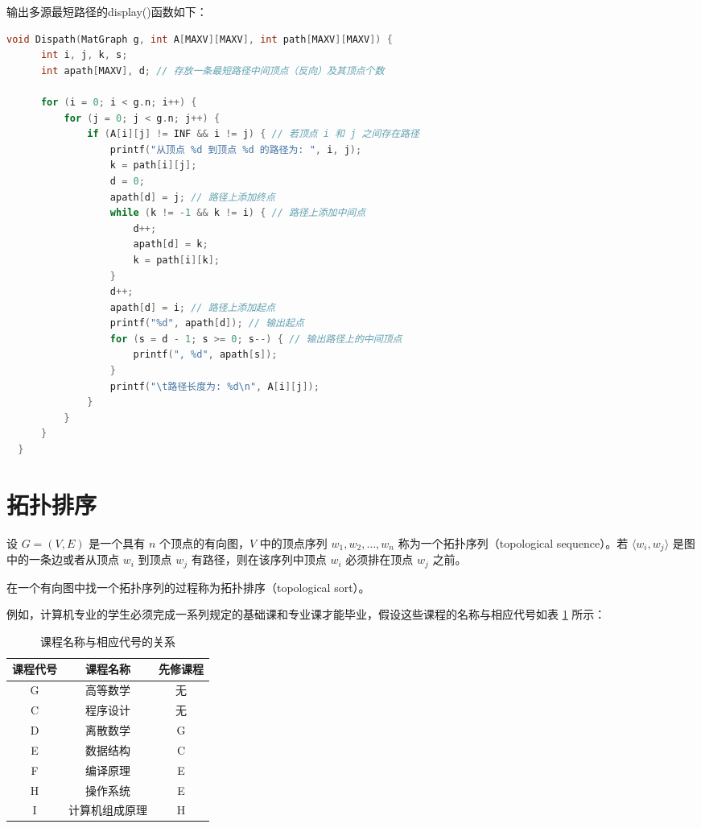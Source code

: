 \documentclass[lang=cn,newtx,10pt,scheme=chinese]{../elegantbook}
\begin{document}
输出多源最短路径的display()函数如下：

\begin{lstlisting}[language=C, caption={输出最短路径的 Dispath 函数}]
  void Dispath(MatGraph g, int A[MAXV][MAXV], int path[MAXV][MAXV]) {
      int i, j, k, s;
      int apath[MAXV], d; // 存放一条最短路径中间顶点（反向）及其顶点个数
  
      for (i = 0; i < g.n; i++) {
          for (j = 0; j < g.n; j++) {
              if (A[i][j] != INF && i != j) { // 若顶点 i 和 j 之间存在路径
                  printf("从顶点 %d 到顶点 %d 的路径为: ", i, j);
                  k = path[i][j];
                  d = 0;
                  apath[d] = j; // 路径上添加终点
                  while (k != -1 && k != i) { // 路径上添加中间点
                      d++;
                      apath[d] = k;
                      k = path[i][k];
                  }
                  d++;
                  apath[d] = i; // 路径上添加起点
                  printf("%d", apath[d]); // 输出起点
                  for (s = d - 1; s >= 0; s--) { // 输出路径上的中间顶点
                      printf(", %d", apath[s]);
                  }
                  printf("\t路径长度为: %d\n", A[i][j]);
              }
          }
      }
  }
  \end{lstlisting}

\section{拓扑排序}

设 $G = (V, E)$ 是一个具有 $n$ 个顶点的有向图，$V$ 中的顶点序列 $w_1, w_2, \dots, w_n$ 称为一个拓扑序列（topological sequence）。若 $\langle w_i, w_j \rangle$ 是图中的一条边或者从顶点 $w_i$ 到顶点 $w_j$ 有路径，则在该序列中顶点 $w_i$ 必须排在顶点 $w_j$ 之前。

在一个有向图中找一个拓扑序列的过程称为拓扑排序（topological sort）。

例如，计算机专业的学生必须完成一系列规定的基础课和专业课才能毕业，假设这些课程的名称与相应代号如表 \ref{tab:course} 所示：

\begin{table}[h!]
  \centering
  \caption{课程名称与相应代号的关系}
  \label{tab:course}
  \begin{tabular}{|c|c|c|}
    \hline
    课程代号 & 课程名称 & 先修课程 \\ \hline
    G & 高等数学 & 无 \\ \hline
    C & 程序设计 & 无 \\ \hline
    D & 离散数学 & G \\ \hline
    E & 数据结构 & C \\ \hline
    F & 编译原理 & E \\ \hline
    H & 操作系统 & E \\ \hline
    I & 计算机组成原理 & H \\ \hline
  \end{tabular}
\end{table}
\end{document}
